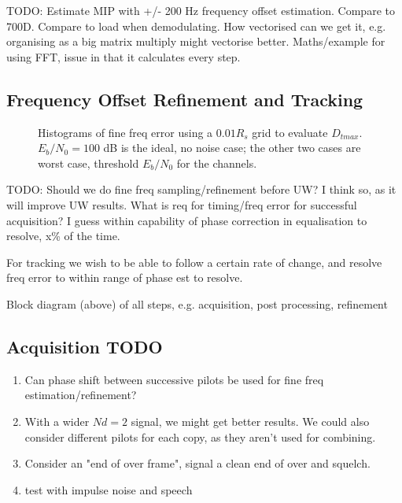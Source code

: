 \documentclass{article}
\begin{document}
{TODO: Estimate MIP with +/- 200 Hz frequency offset estimation. Compare to 700D.  Compare to load when demodulating.  How vectorised can we get it, e.g. organising as a big matrix multiply might vectorise better. Maths/example for using FFT, issue in that it calculates every step.

\subsection{Frequency Offset Refinement and Tracking}

\begin{figure}[H]
\caption{Histograms of fine freq error using a $0.01R_s$ grid to evaluate $D_{tmax}$. $E_b/N_0=100$ dB is the ideal, no noise case; the other two cases are worst case, threshold $E_b/N_0$ for the channels.}
\label{fig:acq_fine_hist}
\begin{center}

\end{center}
\end{figure}

TODO: Should we do fine freq sampling/refinement before UW?  I think so, as it will improve UW results.  What is req for timing/freq error for successful acquisition?  I guess within capability of phase correction in equalisation to resolve, x\% of the time.

For tracking we wish to be able to follow a certain rate of change, and resolve freq error to within range of phase est to resolve.

Block diagram (above) of all steps, e.g. acquisition, post processing, refinement

\subsection{Acquisition TODO}

\begin{enumerate}
\item Can phase shift between successive pilots be used for fine freq estimation/refinement?
\item With a wider $Nd=2$ signal, we might get better results.  We could also consider different pilots for each copy, as they aren't used for combining.
\item Consider an "end of over frame", signal a clean end of over and squelch.
\item test with impulse noise and speech
\end{enumerate}

}
\end{document}
